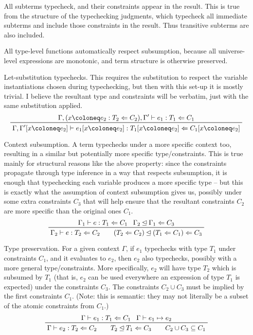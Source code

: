 \documentclass[11pt, twoside, reqno]{book}
\newcommand{\subsumedBy}{\unlhd}
\begin{document}
All subterms typecheck, and their constraints appear in the result.
This is true from the structure of the typechecking judgments, which typecheck all immediate subterms and include those constraints in the result.
Thus transitive subterms are also included.

All type-level functions automatically respect subsumption, because all universe-level expressions are monotonic, and term structure is otherwise preserved.

Let-substitution typechecks.
This requires the substitution to respect the variable instantiations chosen during typechecking, but then with this set-up it is mostly trivial.
I believe the resultant type and constraints will be verbatim, just with the same substitution applied.
\begin{displaymath}
\prftree{\Gamma, (x \coloneq e_2 : T_2 \Leftarrow C_2), \Gamma^\prime \vdash e_1 : T_1 \Leftarrow C_1}{\Gamma, \Gamma^\prime[x \coloneq e_2] \vdash e_1[x \coloneq e_2] : T_1[x \coloneq e_2] \Leftarrow C_1[x \coloneq e_2]}
\end{displaymath}

Context subsumption.
A term typechecks under a more specific context too, resulting in a similar but potentially more specific type/constraints.
This is true mainly for structural reasons like the above property: since the constraints propagate through type inference in a way that respects subsumption, it is enough that typechecking each variable produces a more specific type -- but this is exactly what the assumption of context subsumption gives us, possibly under some extra constraints \(C_3\) that will help ensure that the resultant constraints \(C_2\) are more specific than the original ones \(C_1\).
\begin{displaymath}
\prftree{\Gamma_1 \vdash e : T_1 \Leftarrow C_1}{\Gamma_2 \subsumedBy \Gamma_1 \Leftarrow C_3}{\Gamma_2 \vdash e : T_2 \Leftarrow C_2 \qquad (T_2 \Leftarrow C_2) \subsumedBy (T_1 \Leftarrow C_1) \Leftarrow C_3}
\end{displaymath}

Type preservation.
For a given context \(\Gamma\), if \(e_1\) typechecks with type \(T_1\) under constraints \(C_1\), and it evaluates to \(e_2\), then \(e_2\) also typechecks, possibly with a more general type/constraints.
More specifically, \(e_2\) will have type \(T_2\) which is subsumed by \(T_1\) (that is, \(e_2\) can be used everywhere an expression of type \(T_1\) is expected) under the constraints \(C_3\).
The constraints \(C_2 \cup C_3\) must be implied by the first constraints \(C_1\).
(Note: this is semantic: they may not literally be a subset of the atomic constraints from \(C_1\).)
\begin{displaymath}
\prftree{\Gamma \vdash e_1 : T_1 \Leftarrow C_1}{\Gamma \vdash e_1 \mapsto e_2}{\Gamma \vdash e_2 : T_2 \Leftarrow C_2 \qquad T_2 \subsumedBy T_1 \Leftarrow C_3 \qquad C_2 \cup C_3 \subseteq C_1}
\end{displaymath}
\end{document}
